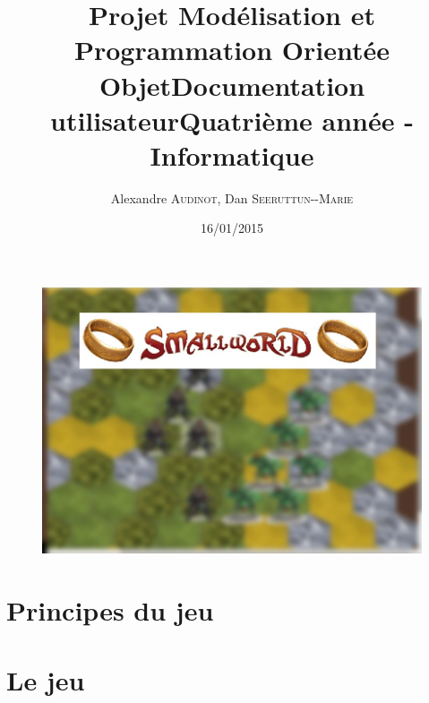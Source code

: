 \documentclass[12pt]{article}
\title{Projet Modélisation et Programmation Orientée Objet\smallbreak Documentation utilisateur\smallbreak Quatrième année - Informatique }
\author{Alexandre \textsc{Audinot},  Dan \textsc{Seeruttun-{}-Marie}}
\date{16/01/2015}
\begin{document}
\maketitle

\begin{figure}[!h] 
\centerline{\includegraphics[scale=0.65]{img/flou.jpg}}
\end{figure}
\newpage

\newpage
\tableofcontents
\newpage

\section{Principes du jeu}

\newpage
\section{Le jeu}

\end{document}
